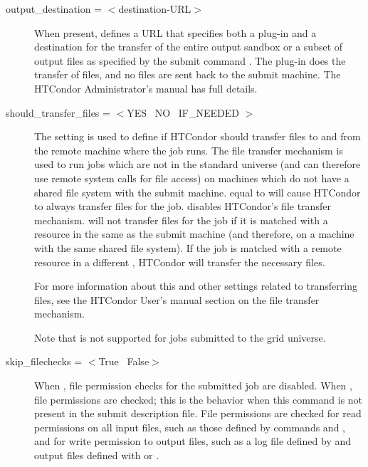 \begin{description}

\label{man-condor-submit-output-destintation}
\item[output\_destination = $<$destination-URL$>$] 
When present, defines a URL that specifies both a plug-in and a
destination for the transfer of the entire output sandbox or
a subset of output files as specified by the submit command
.
The plug-in does the transfer of files, 
and no files are sent back to the submit machine.
The HTCondor Administrator's manual has full details.


\label{man-condor-submit-should-transfer-files}
\item[should\_transfer\_files = $<$YES \Bar\ NO \Bar\ IF\_NEEDED $>$] 
The  setting is used to define if HTCondor
should transfer files to and from the remote machine where the job
runs.
The file transfer mechanism is used to run jobs which are not in the
standard universe (and can therefore use remote system calls for file
access) on machines which do not have a shared file system with the
submit machine.
 equal to  will cause HTCondor to
always transfer files for the job.
 disables HTCondor's file transfer mechanism.
 will not transfer files for the job if it is matched
with a resource in the same  as the submit
machine (and therefore, on a machine with the same shared file
system).
If the job is matched with a remote resource in a different 
, HTCondor will transfer the necessary files. 

For more information about this and other settings related to
transferring files, see the HTCondor User's manual section
on the file transfer mechanism. 

Note that  is not supported
for jobs submitted to the grid universe.

\label{man-condor-submit-skip-filechecks}
\item[skip\_filechecks = $<$True \Bar\ False$>$]
When ,
file permission checks for the submitted job are disabled.
When , file permissions are checked; this is the behavior
when this command is not present in the submit description file.
File permissions are checked for read permissions on all input files,
such as those defined by 
commands  and ,
and for write permission to output files, 
such as a log file defined by  and output files defined with
 or .


\end{description}
